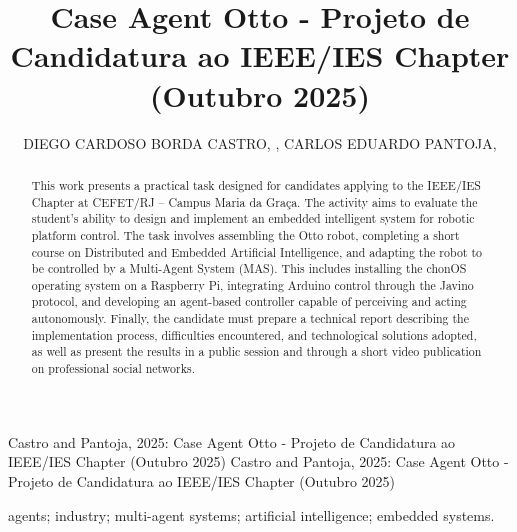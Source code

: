 \documentclass{ieeeojies}
\begin{document}
\title{Case Agent Otto - Projeto de Candidatura ao IEEE/IES Chapter (Outubro 2025)}
\author{\uppercase{Diego Cardoso Borda Castro}, ,
\uppercase{Carlos Eduardo Pantoja}, }
\address[1]{Federal Center For Technological Education (CEFET/RJ)}

\markboth
{Castro and Pantoja, 2025: Case Agent Otto - Projeto de Candidatura ao IEEE/IES Chapter (Outubro 2025)}
{Castro and Pantoja, 2025: Case Agent Otto - Projeto de Candidatura ao IEEE/IES Chapter (Outubro 2025)}


\begin{abstract}
    This work presents a practical task designed for candidates applying to the IEEE/IES Chapter at CEFET/RJ – Campus Maria da Graça. The activity aims to evaluate the student’s ability to design and implement an embedded intelligent system for robotic platform control. The task involves assembling the Otto robot, completing a short course on Distributed and Embedded Artificial Intelligence, and adapting the robot to be controlled by a Multi-Agent System (MAS). This includes installing the chonOS operating system on a Raspberry Pi, integrating Arduino control through the Javino protocol, and developing an agent-based controller capable of perceiving and acting autonomously. Finally, the candidate must prepare a technical report describing the implementation process, difficulties encountered, and technological solutions adopted, as well as present the results in a public session and through a short video publication on professional social networks.
\end{abstract}

\begin{keywords}
agents; industry; multi-agent systems; artificial intelligence; embedded systems.
\end{keywords}

\titlepgskip=-15pt
\end{document}
